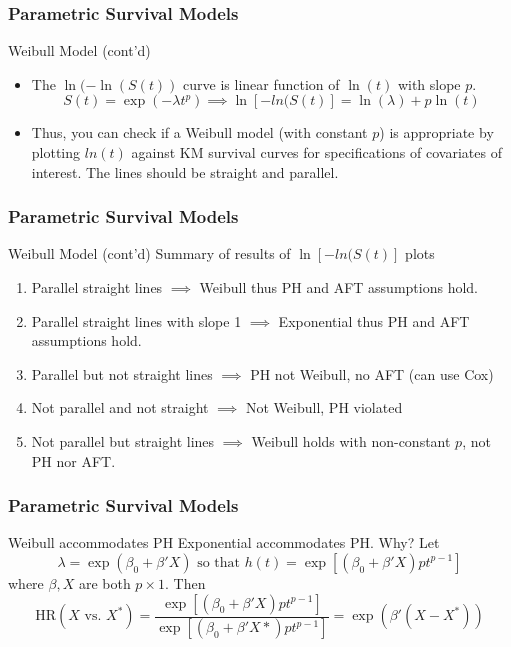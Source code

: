 \documentclass{beamer}
\theoremstyle{definition}
\begin{document}
\begin{frame}
\frametitle{Parametric Survival Models}
\begin{block}{Weibull Model (cont'd)}
\begin{itemize}
\item The $\ln(-\ln(S(t))$ curve is linear function of $\ln(t)$ with slope $p$.
\[ S(t)  = \exp(-\lambda t^p) \implies \ln[-ln(S(t)] = \ln(\lambda) + p \ln(t)
\]
\item Thus, you can check if a Weibull model (with constant $p$) is appropriate by plotting $ln(t)$ against KM survival curves for specifications of covariates of interest. The lines should be straight and parallel.

\end{itemize}
\end{block}
\end{frame}


\begin{frame}
\frametitle{Parametric Survival Models}
\begin{block}{Weibull Model (cont'd)}
Summary of results of $\ln[-ln(S(t)]$ plots
\begin{enumerate}
\item Parallel straight lines $\implies$ Weibull thus PH and AFT assumptions hold.
\item Parallel straight lines with slope 1 $\implies$ Exponential thus PH and AFT assumptions hold.
\item Parallel but not straight lines $\implies$ PH not Weibull, no AFT (can use Cox)
\item Not parallel and not straight $\implies$ Not Weibull, PH violated
\item Not parallel but straight lines $\implies$ Weibull holds with non-constant $p$, not PH nor AFT.
\end{enumerate}
\end{block}
\end{frame}

\begin{frame}
\frametitle{Parametric Survival Models}
\begin{block}{Weibull accommodates PH}
Exponential accommodates PH. Why? Let
\[
\lambda=\exp(\beta_0 + \beta' X) \text{ so that }  h(t) = \exp[(\beta_0 + \beta' X) p t^{p-1}]
\] where $\beta, X$ are both $p \times 1$.
Then
\[
\text{HR}(X \text{ vs. } X^*)  = \dfrac{ \exp[(\beta_0 + \beta' X) p t^{p-1}]}{ \exp[(\beta_0 + \beta' X*) p t^{p-1}]} = \exp(\beta'(X - X^*))
\]
\end{block}
\end{frame}
\end{document}
